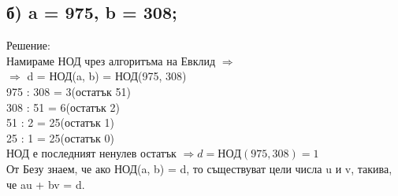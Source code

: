 \documentclass[12pt]{article}
\begin{document}
\subsection*{б) a = 975, b = 308;}
Решение:\\
Намираме НОД чрез алгоритъма на Евклид $\Rightarrow$\\
$\Rightarrow$ d = НОД(a, b) = НОД(975, 308)\\
975 : 308 = 3(остатък 51)\\
308 : 51 = 6(остатък 2)\\
51 : 2 = 25(остатък 1)\\
25 : 1 = 25(остатък 0)\\
НОД е последният ненулев остатък $\Rightarrow d = НОД(975, 308) = 1$\\
От Безу знаем, че ако НОД(a, b) = d, то съществуват цели числа u и v, такива, че au + bv = d.\\
\end{document}
